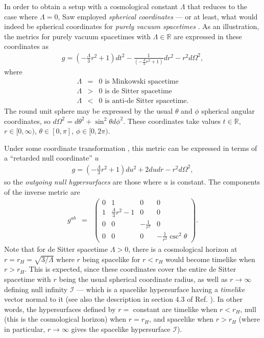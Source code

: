 \documentclass[aps,pre,preprint,superscriptaddress,showpacs,showkeys]{revtex4-1}
\newcommand{\R}{{\mathbb R}}
\begin{document}
In order to obtain a setup with a cosmological constant $\Lambda$ that reduces to the case where $\Lambda=0$, Saw \cite{Vee2016,Vee2017} employed \emph{spherical coordinates} --- or at least, what would indeed be spherical coordinates for \emph{purely vacuum spacetimes} \cite{GP}. As an illustration, the metrics for purely vacuum spacetimes with $\Lambda\in\R$ are expressed in these coordinates as
\begin{eqnarray}
g=\left(-\frac{\Lambda}{3}r^2+1\right)dt^2-\frac{1}{\left(-\frac{\Lambda}{3}r^2+1\right)}dr^2-r^2d\Omega^2,
\end{eqnarray}
where
\begin{eqnarray*}
\Lambda&=&0\textrm{ is Minkowski spacetime}\\
\Lambda&>&0\textrm{ is de Sitter spacetime}\\
\Lambda&<&0\textrm{ is anti-de Sitter spacetime.}
\end{eqnarray*}
The round unit sphere may be expressed by the usual $\theta$ and $\phi$ spherical angular coordinates, so $d\Omega^2=d\theta^2+\sin^2{\theta}d\phi^2$. These coordinates take values $t\in\R$, $r\in[0,\infty)$, $\theta\in[0,\pi]$, $\phi\in[0,2\pi)$.

Under some coordinate transformation \cite{Vee2016}, this metric can be expressed in terms of a ``retarded null coordinate'' $u$
\begin{eqnarray}\label{puremet}
g=\left(-\frac{\Lambda}{3}r^2+1\right)du^2+2dudr-r^2d\Omega^2,
\end{eqnarray}
so the \emph{outgoing null hypersurfaces} are those where $u$ is constant. The components of the inverse metric are
\begin{eqnarray}\label{puremetinv}
g^{ab}&=&
\begin{pmatrix}
  0 & 1 & 0 & 0 \\
  1 & \frac{\Lambda}{3}r^2-1 & 0 & 0 \\
  0 & 0 & -\frac{1}{r^2} & 0 \\
	0 & 0 & 0 & -\frac{1}{r^2}\csc^2{\theta}
\end{pmatrix}.
\end{eqnarray}
Note that for de Sitter spacetime $\Lambda>0$, there is a cosmological horizon at $r=r_H=\sqrt{3/\Lambda}$ where $r$ being spacelike for $r<r_H$ would become timelike when $r>r_H$. This is expected, since these coordinates cover the entire de Sitter spacetime with $r$ being the usual spherical coordinate radius, as well as $r\rightarrow\infty$ defining null infinity $\mathcal{I}$ --- which is a spacelike hypersurface having a \emph{timelike} vector normal to it (see also the description in section 4.3 of Ref. \cite{GP}). In other words, the hypersurfaces defined by $r=$ constant are timelike when $r<r_H$, null (this is the cosmological horizon) when $r=r_H$, and spacelike when $r>r_H$ (where in particular, $r\rightarrow\infty$ gives the spacelike hypersurface $\mathcal{I}$).
\end{document}
